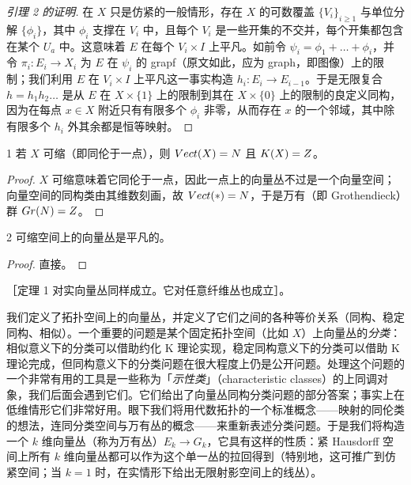 \begin{proof}[引理 2 的证明]

在 $X$ 只是仿紧的一般情形，存在 $X$ 的可数覆盖 $\{V_i\}_{i\ge1}$ 与单位分解 $\{\phi_i\}$，其中 $\phi_i$ 支撑在 $V_i$ 中，且每个 $V_i$ 是一些开集的不交并，每个开集都包含在某个 $U_a$ 中。这意味着 $E$ 在每个 $V_i\times I$ 上平凡。如前令 $\psi_i=\phi_1+\dots+\phi_i$，并令 $\pi_i: E_i\to X_i$ 为 $E$ 在 $\psi_i$ 的 grapf（原文如此，应为 graph，即图像）上的限制；我们利用 $E$ 在 $V_i\times I$ 上平凡这一事实构造 $h_i: E_i\to E_{i-1}$。于是无限复合 $h=h_1h_2\dots$ 是从 $E$ 在 $X\times\{1\}$ 上的限制到其在 $X\times\{0\}$ 上的限制的良定义同构，因为在每点 $x\in X$ 附近只有有限多个 $\phi_i$ 非零，从而存在 $x$ 的一个邻域，其中除有限多个 $h_i$ 外其余都是恒等映射。
\end{proof}

\begin{cor}{1}
若 $X$ 可缩（即同伦于一点），则 $Vect(X)=N$ 且 $K(X)=Z$。
\end{cor}

\begin{proof}
$X$ 可缩意味着它同伦于一点，因此一点上的向量丛不过是一个向量空间；向量空间的同构类由其维数刻画，故 $Vect(*)=N$，于是万有（即 Grothendieck）群 $Gr(N)=Z$。
\end{proof}

\begin{cor}{2}
可缩空间上的向量丛是平凡的。
\end{cor}

\begin{proof}
直接。
\end{proof}


［定理 1 对实向量丛同样成立。它对任意纤维丛也成立］。

我们定义了拓扑空间上的向量丛，并定义了它们之间的各种等价关系（同构、稳定同构、相似）。一个重要的问题是某个固定拓扑空间（比如 $X$）上向量丛的\emph{分类}：相似意义下的分类可以借助约化 K 理论实现，稳定同构意义下的分类可以借助 K 理论完成，但同构意义下的分类问题在很大程度上仍是公开问题。处理这个问题的一个非常有用的工具是一些称为「\emph{示性类}」（characteristic classes）的上同调对象，我们后面会遇到它们。它们给出了向量丛同构分类问题的部分答案；事实上在低维情形它们非常好用。眼下我们将用代数拓扑的一个标准概念——映射的同伦类的想法，连同分类空间与万有丛的概念——来重新表述分类问题。于是我们将构造一个 $k$ 维向量丛（称为万有丛）$E_k\to G_k$，它具有这样的性质：紧 Hausdorff 空间上所有 $k$ 维向量丛都可以作为这个单一丛的拉回得到（特别地，这可推广到仿紧空间；当 $k=1$ 时，在实情形下给出无限射影空间上的线丛）。

